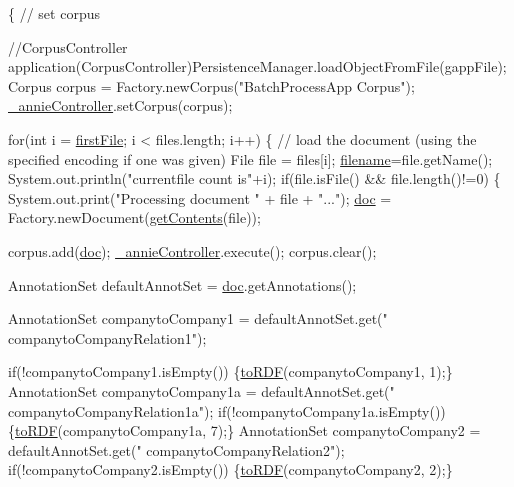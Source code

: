 \begin{DoxyCode}
                                                                \{
        \textcolor{comment}{// set corpus}

        \textcolor{comment}{//CorpusController
       application(CorpusController)PersistenceManager.loadObjectFromFile(gappFile);}
        Corpus corpus = Factory.newCorpus(\textcolor{stringliteral}{"BatchProcessApp Corpus"});
        \hyperlink{class_h_l_t_tutorial_ae3ecde0fc3f5486e117de53e615058ca}{\_annieController}.setCorpus(corpus);



        \textcolor{keywordflow}{for}(\textcolor{keywordtype}{int} i = \hyperlink{class_h_l_t_tutorial_aeca9a1b824beab58de7f27e639b6fc52}{firstFile}; i < files.length; i++) \{
            \textcolor{comment}{// load the document (using the specified encoding if one was
       given)}
            File file = files[i];
            \hyperlink{class_h_l_t_tutorial_ab4c914d0fd25e0dfcb7fdeb677b26211}{filename}=file.getName();
            System.out.println(\textcolor{stringliteral}{"currentfile count is"}+i);
            \textcolor{keywordflow}{if}(file.isFile() && file.length()!=0)   
            \{
                System.out.print(\textcolor{stringliteral}{"Processing document "} + file + \textcolor{stringliteral}{"..."});
                \hyperlink{class_h_l_t_tutorial_adc313cb5e485ec03e21897d5c0132591}{doc} = Factory.newDocument(\hyperlink{class_h_l_t_tutorial_a2df4fcba977cad0df60ff6dd6356dbb5}{getContents}(file));




                corpus.add(\hyperlink{class_h_l_t_tutorial_adc313cb5e485ec03e21897d5c0132591}{doc});
                \hyperlink{class_h_l_t_tutorial_ae3ecde0fc3f5486e117de53e615058ca}{\_annieController}.execute();
                corpus.clear();  
                

                AnnotationSet defaultAnnotSet = \hyperlink{class_h_l_t_tutorial_adc313cb5e485ec03e21897d5c0132591}{doc}.getAnnotations();





                AnnotationSet companytoCompany1 = defaultAnnotSet.get(\textcolor{stringliteral}{"
      companytoCompanyRelation1"});


                \textcolor{keywordflow}{if}(!companytoCompany1.isEmpty())
                \{\hyperlink{class_h_l_t_tutorial_a5f66220b793be678dbd3d5e75bb017f0}{toRDF}(companytoCompany1,  1);\}
                AnnotationSet companytoCompany1a = defaultAnnotSet.get(\textcolor{stringliteral}{"
      companytoCompanyRelation1a"});
                \textcolor{keywordflow}{if}(!companytoCompany1a.isEmpty())
                \{\hyperlink{class_h_l_t_tutorial_a5f66220b793be678dbd3d5e75bb017f0}{toRDF}(companytoCompany1a, 7);\}
                AnnotationSet companytoCompany2 = defaultAnnotSet.get(\textcolor{stringliteral}{"
      companytoCompanyRelation2"});
                \textcolor{keywordflow}{if}(!companytoCompany2.isEmpty())
                \{\hyperlink{class_h_l_t_tutorial_a5f66220b793be678dbd3d5e75bb017f0}{toRDF}(companytoCompany2, 2);\}



\end{DoxyCode}

